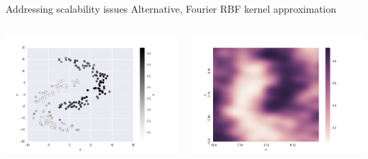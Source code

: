 \documentclass[11pt]{beamer}
\begin{document}
\begin{frame}{Addressing scalability issues}
Alternative, Fourier RBF kernel approximation
\begin{columns}
\includegraphics[scale=0.3]{arcs_rbfsampler.png} 

\includegraphics[scale=0.3]{arcs_rbfsampler_hm.png} 
\end{columns}

\end{frame}
\end{document}
